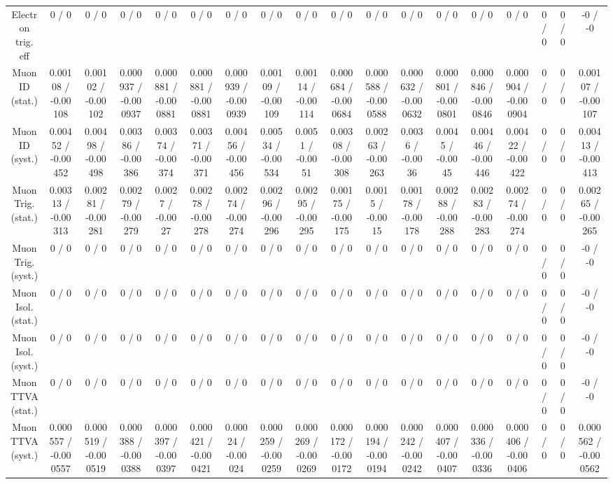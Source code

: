 \documentclass[10pt]{article}
\begin{document}
\begin{table}[htbp]
\begin{center}
\begin{tabular}{|c|c|c|c|c|c|c|c|c|c|c|c|c|c|c|c|c|c|}
  Electron trig. eff & 0 / 0 & 0 / 0 & 0 / 0 & 0 / 0 & 0 / 0 & 0 / 0 & 0 / 0 & 0 / 0 & 0 / 0 & 0 / 0 & 0 / 0 & 0 / 0 & 0 / 0 & 0 / 0 & 0 / 0 & 0 / 0 & -0 / -0 \\ 
  Muon ID (stat.) & 0.00108 / -0.00108 & 0.00102 / -0.00102 & 0.000937 / -0.000937 & 0.000881 / -0.000881 & 0.000881 / -0.000881 & 0.000939 / -0.000939 & 0.00109 / -0.00109 & 0.00114 / -0.00114 & 0.000684 / -0.000684 & 0.000588 / -0.000588 & 0.000632 / -0.000632 & 0.000801 / -0.000801 & 0.000846 / -0.000846 & 0.000904 / -0.000904 & 0 / 0 & 0 / 0 & 0.00107 / -0.00107 \\ 
  Muon ID (syst.) & 0.00452 / -0.00452 & 0.00498 / -0.00498 & 0.00386 / -0.00386 & 0.00374 / -0.00374 & 0.00371 / -0.00371 & 0.00456 / -0.00456 & 0.00534 / -0.00534 & 0.0051 / -0.0051 & 0.00308 / -0.00308 & 0.00263 / -0.00263 & 0.0036 / -0.0036 & 0.0045 / -0.0045 & 0.00446 / -0.00446 & 0.00422 / -0.00422 & 0 / 0 & 0 / 0 & 0.00413 / -0.00413 \\ 
  Muon Trig. (stat.) & 0.00313 / -0.00313 & 0.00281 / -0.00281 & 0.00279 / -0.00279 & 0.0027 / -0.0027 & 0.00278 / -0.00278 & 0.00274 / -0.00274 & 0.00296 / -0.00296 & 0.00295 / -0.00295 & 0.00175 / -0.00175 & 0.0015 / -0.0015 & 0.00178 / -0.00178 & 0.00288 / -0.00288 & 0.00283 / -0.00283 & 0.00274 / -0.00274 & 0 / 0 & 0 / 0 & 0.00265 / -0.00265 \\ 
  Muon Trig. (syst.) & 0 / 0 & 0 / 0 & 0 / 0 & 0 / 0 & 0 / 0 & 0 / 0 & 0 / 0 & 0 / 0 & 0 / 0 & 0 / 0 & 0 / 0 & 0 / 0 & 0 / 0 & 0 / 0 & 0 / 0 & 0 / 0 & -0 / -0 \\ 
  Muon Isol. (stat.) & 0 / 0 & 0 / 0 & 0 / 0 & 0 / 0 & 0 / 0 & 0 / 0 & 0 / 0 & 0 / 0 & 0 / 0 & 0 / 0 & 0 / 0 & 0 / 0 & 0 / 0 & 0 / 0 & 0 / 0 & 0 / 0 & -0 / -0 \\ 
  Muon Isol. (syst.) & 0 / 0 & 0 / 0 & 0 / 0 & 0 / 0 & 0 / 0 & 0 / 0 & 0 / 0 & 0 / 0 & 0 / 0 & 0 / 0 & 0 / 0 & 0 / 0 & 0 / 0 & 0 / 0 & 0 / 0 & 0 / 0 & -0 / -0 \\ 
  Muon TTVA (stat.) & 0 / 0 & 0 / 0 & 0 / 0 & 0 / 0 & 0 / 0 & 0 / 0 & 0 / 0 & 0 / 0 & 0 / 0 & 0 / 0 & 0 / 0 & 0 / 0 & 0 / 0 & 0 / 0 & 0 / 0 & 0 / 0 & -0 / -0 \\ 
  Muon TTVA (syst.) & 0.000557 / -0.000557 & 0.000519 / -0.000519 & 0.000388 / -0.000388 & 0.000397 / -0.000397 & 0.000421 / -0.000421 & 0.00024 / -0.00024 & 0.000259 / -0.000259 & 0.000269 / -0.000269 & 0.000172 / -0.000172 & 0.000194 / -0.000194 & 0.000242 / -0.000242 & 0.000407 / -0.000407 & 0.000336 / -0.000336 & 0.000406 / -0.000406 & 0 / 0 & 0 / 0 & 0.000562 / -0.000562 \\ 

\end{tabular}
\end{center}
\end{table}
\end{document}
